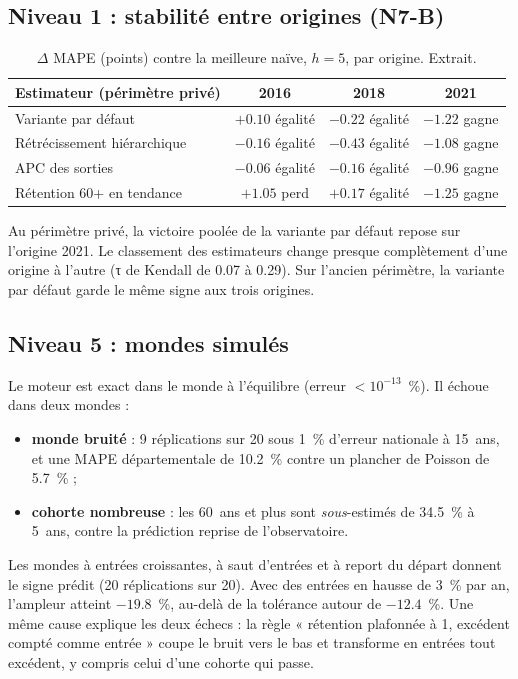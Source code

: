 \subsection{Niveau 1 : stabilité entre origines (N7-B)}
\begin{table}[h]
\centering\small
\begin{tabular}{@{}lccc@{}}
\toprule
Estimateur (périmètre privé) & 2016 & 2018 & 2021 \\
\midrule
Variante par défaut & $+\num{0.10}$ égalité & $\num{-0.22}$ égalité & $\num{-1.22}$ gagne \\
Rétrécissement hiérarchique & $\num{-0.16}$ égalité & $\num{-0.43}$ égalité & $\num{-1.08}$ gagne \\
APC des sorties & $\num{-0.06}$ égalité & $\num{-0.16}$ égalité & $\num{-0.96}$ gagne \\
Rétention 60+ en tendance & $+\num{1.05}$ perd & $+\num{0.17}$ égalité & $\num{-1.25}$ gagne \\
\bottomrule
\end{tabular}
\caption{$\Delta$ MAPE (points) contre la meilleure naïve, $h = 5$, par origine\mesure{}. Extrait.}
\end{table}
Au périmètre privé, la victoire poolée de la variante par défaut repose sur l'origine 2021. Le
classement des estimateurs change presque complètement d'une origine à l'autre (τ de Kendall de
\num{0.07} à \num{0.29}\mesure{}). Sur l'ancien périmètre, la variante par défaut garde le même signe
aux trois origines.

\subsection{Niveau 5 : mondes simulés}
Le moteur est exact dans le monde à l'équilibre (erreur $< 10^{-13}$\mesure{}~\%). Il échoue dans deux
mondes :
\begin{itemize}
  \item \textbf{monde bruité} : 9 réplications sur 20 sous 1~\% d'erreur nationale à 15~ans, et une
        MAPE départementale de \num{10.2}\mesure{}~\% contre un plancher de Poisson de
        \num{5.7}\derive{}~\% ;
  \item \textbf{cohorte nombreuse} : les 60~ans et plus sont \emph{sous}-estimés de
        \num{34.5}\mesure{}~\% à 5~ans, contre la prédiction reprise de l'observatoire.
\end{itemize}
Les mondes à entrées croissantes, à saut d'entrées et à report du départ donnent le signe prédit
(20 réplications sur 20). Avec des entrées en hausse de 3~\% par an, l'ampleur atteint
$\num{-19.8}$\mesure{}~\%, au-delà de la tolérance autour de $-\num{12.4}$~\%. Une même cause explique
les deux échecs : la règle « rétention plafonnée à 1, excédent compté comme entrée » coupe le bruit
vers le bas et transforme en entrées tout excédent, y compris celui d'une cohorte qui passe.

